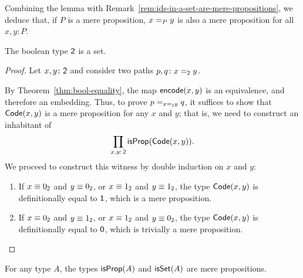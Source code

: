 \begin{rem}\label{rem:ids-in-mere-propositions-are-singletons}
    Combining the lemma with Remark~\ref{rem:ids-in-a-set-are-mere-propositions}, we deduce that, if $P$ is a mere proposition, $x\mathrel{=_{P}}y$ is also a mere proposition for all $x,y\colon P$.
\end{rem}


\begin{thm}\label{thm:boolean-type-is-set}
    The boolean type\/ $\mathsf{2}$ is a set.
\end{thm}

\begin{proof}
    Let $x,y\colon\fun2$ and consider two paths $p,q\colon x\eq{\fun2}y$. 
    
    By Theorem~\ref{thm:bool-equality}, the map $\mathsf{encode}(x,y)$ is an equivalence, and therefore an embedding. Thus, to prove $p\mathrel{=_{x\mathrel{=_{\mathsf{2}}}y}}q$, it suffices to show that $\mathsf{Code}(x,y)$ is a mere proposition for any $x$ and $y$; that is, we need to construct an inhabitant of
    \[
        \prod_{x,y\colon\fun2}\fun{isProp}(\fun{Code}(x,y)).
    \]
    We proceed to construct this witness by double induction on $x$ and $y$:
    \begin{enumerate}[-]
        \item If $x\equiv0_{\mathsf{2}}$ and $y\equiv0_{\mathsf{2}}$, or $x\equiv1_{\mathsf{2}}$ and $y\equiv1_{\mathsf{2}}$, the type $\mathsf{Code}(x,y)$ is definitionally equal to $\mathsf{1}$, which is a mere proposition.
        
        \item If $x\equiv0_{\mathsf{2}}$ and $y\equiv1_{\mathsf{2}}$, or $x\equiv1_{\mathsf{2}}$ and $y\equiv0_{\mathsf{2}}$, the type $\mathsf{Code}(x,y)$ is definitionally equal to $\mathsf{0}$, which is trivially a mere proposition.
    \end{enumerate}
\end{proof}

\begin{prop}\fe\label{prop:isSet-and-isProp-are-mere-propositions}
    For any type\/ $A$, the types\/ $\mathsf{isProp}(A)$ and\/ $\mathsf{isSet}(A)$ are mere propositions.
\end{prop}

